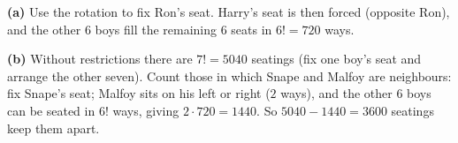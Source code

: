 \textbf{(a)} Use the rotation to fix Ron's seat. Harry's seat is then forced (opposite Ron), and the other $6$ boys fill the remaining $6$ seats in $6!=\boxed{720}$ ways.

\textbf{(b)} Without restrictions there are $7!=5040$ seatings (fix one boy's seat and arrange the other seven). Count those in which Snape and Malfoy are neighbours: fix Snape's seat; Malfoy sits on his left or right ($2$ ways), and the other $6$ boys can be seated in $6!$ ways, giving $2\cdot720=1440$. So $5040-1440=\boxed{3600}$ seatings keep them apart.
